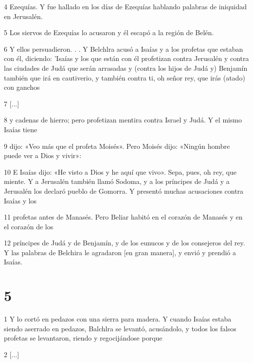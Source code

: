 \par 4 Ezequías. Y fue hallado en los días de Ezequías hablando palabras de iniquidad en Jerusalén.

\par 5 Los siervos de Ezequías lo acusaron y él escapó a la región de Belén.

\par 6 Y ellos persuadieron. . . Y Belchlra acusó a Isaías y a los profetas que estaban con él, diciendo: 'Isaías y los que están con él profetizan contra Jerusalén y contra las ciudades de Judá que serán arrasadas y (contra los hijos de Judá y) Benjamín también que irá en cautiverio, y también contra ti, oh señor rey, que irás (atado) con ganchos

\par 7 [...]

\par 8 y cadenas de hierro; pero profetizan mentira contra Israel y Judá. Y el mismo Isaías tiene

\par 9 dijo: «Veo más que el profeta Moisés». Pero Moisés dijo: «Ningún hombre puede ver a Dios y vivir»:

\par 10 E Isaías dijo: «He visto a Dios y he aquí que vivo». Sepa, pues, oh rey, que miente. Y a Jerusalén también llamó Sodoma, y ​​a los príncipes de Judá y a Jerusalén los declaró pueblo de Gomorra. Y presentó muchas acusaciones contra Isaías y los

\par 11 profetas antes de Manasés. Pero Beliar habitó en el corazón de Manasés y en el corazón de los

\par 12 príncipes de Judá y de Benjamín, y de los eunucos y de los consejeros del rey. Y las palabras de Belchira le agradaron [en gran manera], y envió y prendió a Isaías.

\chapter{5}

\par 1 Y lo cortó en pedazos con una sierra para madera. Y cuando Isaías estaba siendo aserrado en pedazos, Balchlra se levantó, acusándolo, y todos los falsos profetas se levantaron, riendo y regocijándose porque

\par 2 [...]

